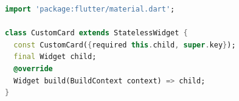 \documentclass{article}
\begin{document}
\begin{lstlisting}[language=Dart, caption={\texttt{\detokenize{lib/widgets/custom_card.dart}}}]
import 'package:flutter/material.dart';

class CustomCard extends StatelessWidget {
  const CustomCard({required this.child, super.key});
  final Widget child;
  @override
  Widget build(BuildContext context) => child;
}
\end{lstlisting}
\end{document}
